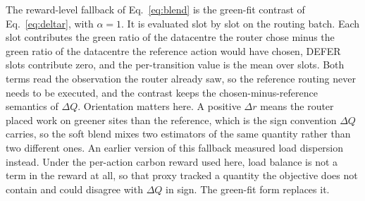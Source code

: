\documentclass{article} %
\begin{document}
The reward-level fallback of Eq.~\ref{eq:blend} is the green-fit contrast of Eq.~\ref{eq:deltar}, with $\alpha{=}1$. It is evaluated slot by slot on the routing batch. Each slot contributes the green ratio of the datacentre the router chose minus the green ratio of the datacentre the reference action would have chosen, DEFER slots contribute zero, and the per-transition value is the mean over slots. Both terms read the observation the router already saw, so the reference routing never needs to be executed, and the contrast keeps the chosen-minus-reference semantics of $\Delta Q$. Orientation matters here. A positive $\Delta r$ means the router placed work on greener sites than the reference, which is the sign convention $\Delta Q$ carries, so the soft blend mixes two estimators of the same quantity rather than two different ones. An earlier version of this fallback measured load dispersion instead. Under the per-action carbon reward used here, load balance is not a term in the reward at all, so that proxy tracked a quantity the objective does not contain and could disagree with $\Delta Q$ in sign. The green-fit form replaces it.
\end{document}
